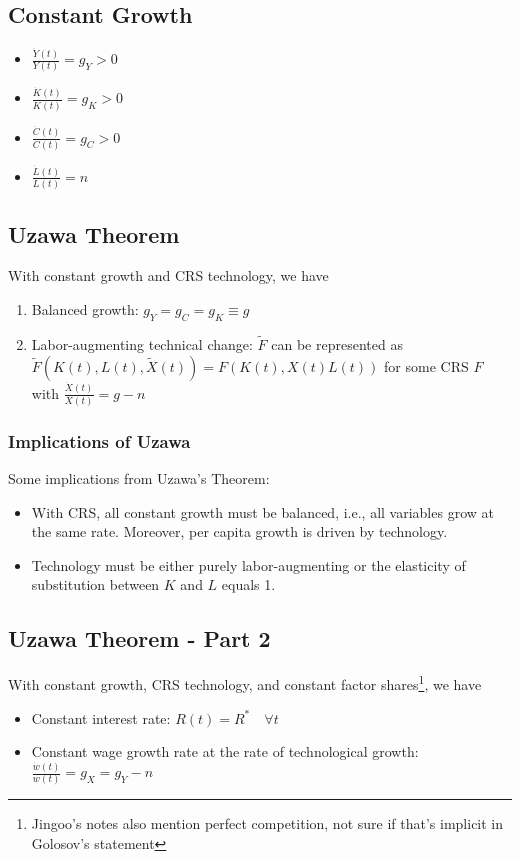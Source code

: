 \documentclass[10pt]{article}
\begin{document}
\subsection{Constant Growth}

\begin{itemize}
    \item $\frac{\dot{Y}(t)}{Y(t)}=g_Y>0$
    \item $\frac{\dot{K}(t)}{K(t)}=g_K>0$
    \item $\frac{\dot{C}(t)}{C(t)}=g_C>0$
    \item $\frac{\dot{L}(t)}{L(t)}=n$
\end{itemize}

\subsection{Uzawa Theorem}

With constant growth and CRS technology, we have

\begin{enumerate}
    \item Balanced growth: $g_Y=g_C=g_K \equiv g$
    \item Labor-augmenting technical change: $\tilde{F}$ can be represented as $\tilde{F}(K(t), L(t), \tilde{X}(t))=F(K(t), X(t) L(t))$ for some CRS $F$ with $\frac{\dot{X}(t)}{X(t)}=g-n$
\end{enumerate}

\subsubsection{Implications of Uzawa}

Some implications from Uzawa's Theorem:
\begin{itemize}
    \item With CRS, all constant growth must be balanced, i.e., all variables grow at the same rate. Moreover, per capita growth is driven by technology.
    \item Technology must be either purely labor-augmenting or the elasticity of substitution between $K$ and $L$ equals 1.
\end{itemize}

\subsection{Uzawa Theorem - Part 2}

With constant growth, CRS technology, 
and constant factor shares\footnote{Jingoo's notes also 
mention perfect competition, not sure if that's 
implicit in Golosov's statement}, we have
\begin{itemize}
    \item Constant interest rate: $R(t)=R^* \quad \forall t$
    \item Constant wage growth rate at the rate of technological growth: $\frac{\dot{w}(t)}{w(t)}=g_X=g_Y-n$
\end{itemize}
\end{document}
